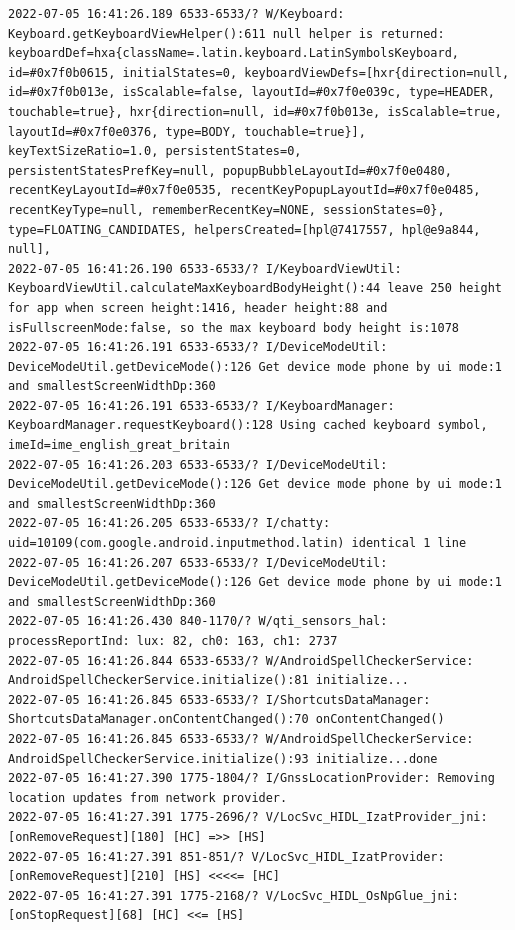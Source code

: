 \documentclass[a4paper,12pt]{book}
\begin{document}
\begin{lstlisting}
2022-07-05 16:41:26.189 6533-6533/? W/Keyboard: Keyboard.getKeyboardViewHelper():611 null helper is returned: keyboardDef=hxa{className=.latin.keyboard.LatinSymbolsKeyboard, id=#0x7f0b0615, initialStates=0, keyboardViewDefs=[hxr{direction=null, id=#0x7f0b013e, isScalable=false, layoutId=#0x7f0e039c, type=HEADER, touchable=true}, hxr{direction=null, id=#0x7f0b013e, isScalable=true, layoutId=#0x7f0e0376, type=BODY, touchable=true}], keyTextSizeRatio=1.0, persistentStates=0, persistentStatesPrefKey=null, popupBubbleLayoutId=#0x7f0e0480, recentKeyLayoutId=#0x7f0e0535, recentKeyPopupLayoutId=#0x7f0e0485, recentKeyType=null, rememberRecentKey=NONE, sessionStates=0}, type=FLOATING_CANDIDATES, helpersCreated=[hpl@7417557, hpl@e9a844, null], 
2022-07-05 16:41:26.190 6533-6533/? I/KeyboardViewUtil: KeyboardViewUtil.calculateMaxKeyboardBodyHeight():44 leave 250 height for app when screen height:1416, header height:88 and isFullscreenMode:false, so the max keyboard body height is:1078
2022-07-05 16:41:26.191 6533-6533/? I/DeviceModeUtil: DeviceModeUtil.getDeviceMode():126 Get device mode phone by ui mode:1 and smallestScreenWidthDp:360
2022-07-05 16:41:26.191 6533-6533/? I/KeyboardManager: KeyboardManager.requestKeyboard():128 Using cached keyboard symbol, imeId=ime_english_great_britain
2022-07-05 16:41:26.203 6533-6533/? I/DeviceModeUtil: DeviceModeUtil.getDeviceMode():126 Get device mode phone by ui mode:1 and smallestScreenWidthDp:360
2022-07-05 16:41:26.205 6533-6533/? I/chatty: uid=10109(com.google.android.inputmethod.latin) identical 1 line
2022-07-05 16:41:26.207 6533-6533/? I/DeviceModeUtil: DeviceModeUtil.getDeviceMode():126 Get device mode phone by ui mode:1 and smallestScreenWidthDp:360
2022-07-05 16:41:26.430 840-1170/? W/qti_sensors_hal: processReportInd: lux: 82, ch0: 163, ch1: 2737
2022-07-05 16:41:26.844 6533-6533/? W/AndroidSpellCheckerService: AndroidSpellCheckerService.initialize():81 initialize...
2022-07-05 16:41:26.845 6533-6533/? I/ShortcutsDataManager: ShortcutsDataManager.onContentChanged():70 onContentChanged()
2022-07-05 16:41:26.845 6533-6533/? W/AndroidSpellCheckerService: AndroidSpellCheckerService.initialize():93 initialize...done
2022-07-05 16:41:27.390 1775-1804/? I/GnssLocationProvider: Removing location updates from network provider.
2022-07-05 16:41:27.391 1775-2696/? V/LocSvc_HIDL_IzatProvider_jni: [onRemoveRequest][180] [HC] =>> [HS]
2022-07-05 16:41:27.391 851-851/? V/LocSvc_HIDL_IzatProvider: [onRemoveRequest][210] [HS] <<<<= [HC]
2022-07-05 16:41:27.391 1775-2168/? V/LocSvc_HIDL_OsNpGlue_jni: [onStopRequest][68] [HC] <<= [HS]

\end{lstlisting}
\end{document}
